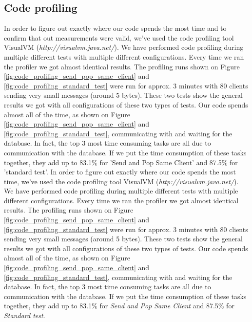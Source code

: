 \documentclass{article}
\begin{document}
        \subsection{Code profiling}
            In order to figure out exactly where our code spends the most time and to confirm that out measurements were valid, we've used the code profiling tool VisualVM (\textit{http://visualvm.java.net/}). We have performed code profiling during multiple different tests with multiple different configurations. Every time we ran the profiler we got almost identical results. The profiling runs shown on Figure \ref{fig:code_profiling_send_pop_same_client} and \ref{fig:code_profiling_standard_test} were run for approx. 3 minutes with 80 clients sending very small messages (around 5 bytes). These two tests show the general results we got with all configurations of these two types of tests. Our code spends almost all of the time, as shown on Figure \ref{fig:code_profiling_send_pop_same_client} and \ref{fig:code_profiling_standard_test}, communicating with and waiting for the database. In fact, the top 3 most time consuming tasks are all due to communication with the database. If we put the time consumption of these tasks together, they add up to 83.1\% for 'Send and Pop Same Client' and 87.5\% for 'standard test'.
            In order to figure out exactly where our code spends the most time, we've used the code profiling tool VisualVM (\textit{http://visualvm.java.net/}). We have performed code profiling during multiple different tests with multiple different configurations. Every time we ran the profiler we got almost identical results. The profiling runs shown on Figure \ref{fig:code_profiling_send_pop_same_client} and \ref{fig:code_profiling_standard_test} were run for approx. 3 minutes with 80 clients sending very small messages (around 5 bytes). These two tests show the general results we got with all configurations of these two types of tests. Our code spends almost all of the time, as shown on Figure \ref{fig:code_profiling_send_pop_same_client} and \ref{fig:code_profiling_standard_test}, communicating with and waiting for the database. In fact, the top 3 most time consuming tasks are all due to communication with the database. If we put the time consumption of these tasks together, they add up to 83.1\% for \textit{Send and Pop Same Client} and 87.5\% for \textit{Standard test}.
\end{document}
